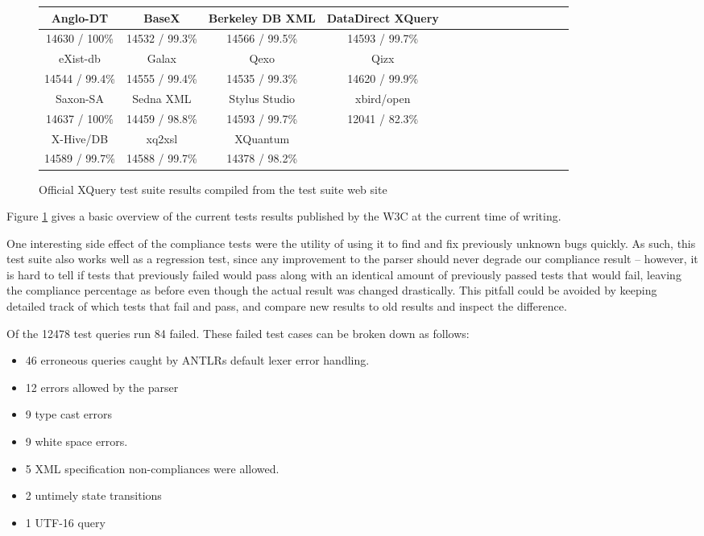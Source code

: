\begin{figure}[h!]
  \begin{center}
    \begin{tabular}{ |c | c | c | c | c | c | c | c | c | c | c | c | c | c | c | }
      \hline
      Anglo-DT        & BaseX           & Berkeley DB XML   & DataDirect XQuery \\ \hline
      14630 / 100\%   & 14532 / 99.3\%  & 14566 / 99.5\%    & 14593 / 99.7\%  \\ \hline \hline
      eXist-db        & Galax           & Qexo              & Qizx \\ \hline            
      14544 / 99.4\%  & 14555 / 99.4\%  & 14535 / 99.3\%    & 14620 / 99.9\% \\ \hline \hline
      Saxon-SA        & Sedna XML       & Stylus Studio     & xbird/open \\ \hline
      14637 / 100\%   & 14459 / 98.8\%  & 14593 / 99.7\%    & 12041 / 82.3\% \\ \hline \hline
      X-Hive/DB       & xq2xsl          & XQuantum          & \\ \hline
      14589 / 99.7\%   & 14588 / 99.7\%  & 14378 / 98.2\%    & \\ 
    \hline
    \end{tabular}
  \end{center}
  \caption[Official XQuery test suite results]{Official XQuery test suite
  results compiled from the test suite web site\cite{w3ctestresults}} 
  \label{figure:table:w3c_test_results}
\end{figure}

Figure \ref{figure:table:w3c_test_results} gives a basic overview of the current
tests results published by the W3C at the current time of writing.

One interesting side effect of the compliance tests were the utility of using it to
find and fix previously unknown bugs quickly. As such, this test suite also
works well as a regression test, since any improvement to the parser should
never degrade our compliance result -- however, it is hard to tell if tests that
previously failed would pass along with an identical amount of previously
passed tests that would fail, leaving the compliance percentage as before even
though the actual result was changed drastically. This pitfall could be
avoided by keeping detailed track of which tests that fail and pass, and compare
new results to old results and inspect the difference.

Of the 12478 test queries run 84 failed. These failed test cases can be broken
down as follows: 
\begin{itemize}
\item 46 erroneous queries caught by ANTLRs default lexer error handling.
\item 12 errors allowed by the parser
\item 9 type cast errors
\item 9 white space errors.
\item 5 XML specification non-compliances were allowed.
\item 2 untimely state transitions
\item 1 UTF-16 query
\end{itemize}

